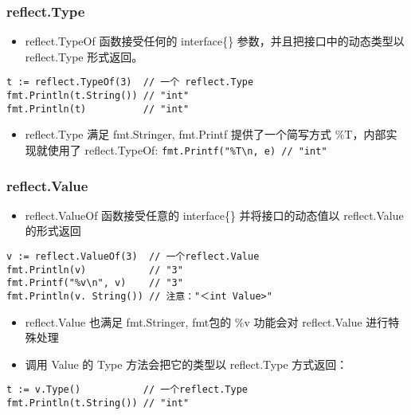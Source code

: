 \hypertarget{reflect.type}{%
\subsubsection{reflect.Type}\label{reflect.type}}

\begin{itemize}
\tightlist
\item
  reflect.TypeOf 函数接受任何的 interface\{\}
  参数，并且把接口中的动态类型以 reflect.Type 形式返回。
\end{itemize}

\begin{verbatim}
t := reflect.TypeOf(3)  // 一个 reflect.Type
fmt.Println(t.String()) // "int"
fmt.Println(t)          // "int"
\end{verbatim}

\begin{itemize}
\tightlist
\item
  reflect.Type 满足 fmt.Stringer, fmt.Printf 提供了一个简写方式
  \%T，内部实现就使用了 reflect.TypeOf:
  \texttt{fmt.Printf("\%T\textbackslash{}n,\ e)\ //\ "int"}
\end{itemize}

\hypertarget{reflect.value}{%
\subsubsection{reflect.Value}\label{reflect.value}}

\begin{itemize}
\tightlist
\item
  reflect.ValueOf 函数接受任意的 interface\{\} 并将接口的动态值以
  reflect.Value 的形式返回
\end{itemize}

\begin{verbatim}
v := reflect.ValueOf(3)  // 一个reflect.Value
fmt.Println(v)           // "3"
fmt.Printf("%v\n", v)    // "3"
fmt.Println(v. String()) // 注意："＜int Value>"
\end{verbatim}

\begin{itemize}
\item
  reflect.Value 也满足 fmt.Stringer, fmt包的 \%v 功能会对 reflect.Value
  进行特殊处理
\item
  调用 Value 的 Type 方法会把它的类型以 reflect.Type 方式返回：
\end{itemize}

\begin{verbatim}
t := v.Type()           // 一个reflect.Type
fmt.Println(t.String()) // "int"
\end{verbatim}

